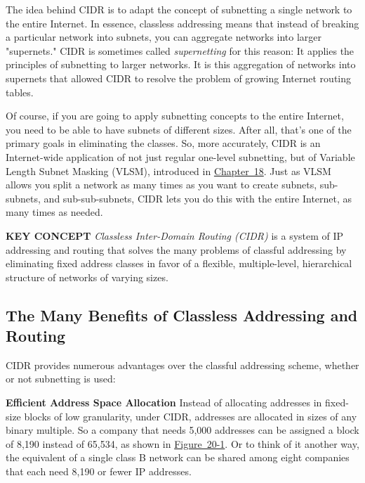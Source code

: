 \documentclass[b5paper,11pt]{memoir}
\begin{document}
The idea behind CIDR is to adapt the concept of subnetting a single
network to the entire Internet. In essence, classless addressing means
that instead of breaking a particular network into subnets, you can
aggregate networks into larger "supernets." CIDR is sometimes called
{\emph{supernetting}} for this reason: It applies the principles of
subnetting to larger networks. It is this aggregation of networks into
supernets that allowed CIDR to resolve the problem of growing Internet
routing tables.

Of course, if you are going to apply subnetting concepts to the entire
Internet, you need to be able to have subnets of different sizes. After
all, that's one of the primary goals in eliminating the classes. So,
more accurately, CIDR is an Internet-wide application of not just
regular one-level subnetting, but of Variable Length Subnet Masking
(VLSM), introduced in \protect\hyperlink{ch18.html}{Chapter~18}. Just as
VLSM allows you split a network as many times as you want to create
subnets, sub-subnets, and sub-sub-subnets, CIDR lets you do this with
the entire Internet, as many times as needed.


{\textbf{KEY CONCEPT}} {\emph{Classless Inter-Domain Routing (CIDR)}} is
a system of IP addressing and routing that solves the many problems of
classful addressing by eliminating fixed address classes in favor of a
flexible, multiple-level, hierarchical structure of networks of varying
sizes.

\subsection[The Many Benefits of Classless Addressing and
Routing]{\texorpdfstring{\protect\hypertarget{ch20.htmlux5cux23the_many_benefits_of_classless_addressin}{}{}The
Many Benefits of Classless Addressing and
Routing}{The Many Benefits of Classless Addressing and Routing}}

CIDR provides numerous advantages over the classful addressing scheme,
whether or not subnetting is used:

{\textbf{Efficient Address Space Allocation}} Instead of allocating
addresses in fixed-size blocks of low granularity, under CIDR, addresses
are allocated in sizes of any binary multiple. So a company that needs
5,000 addresses can be assigned a block of 8,190 instead of 65,534, as
shown in
\protect\hyperlink{ch20.htmlux5cux23classless_addressing_cidr_solves_the_gra}{Figure~20-1}.
Or to think of it another way, the equivalent of a single class B
network can be shared among eight companies that each need 8,190 or
fewer IP addresses.
\end{document}
